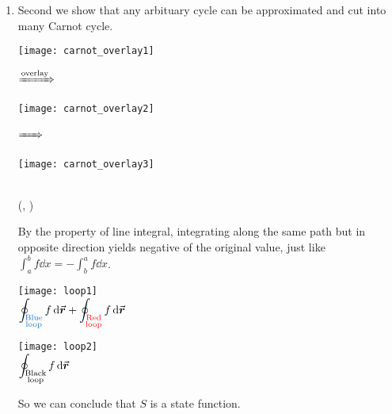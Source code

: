 \documentclass[class=article, crop=false, 12pt]{standalone}
\begin{document}
\begin{enumerate}
    \item Second we show that any arbituary cycle can be approximated and cut into many Carnot cycle.
    
    \begin{center}
        \begin{minipage}{0.28\linewidth}
            \centering
            \texttt{[image: carnot\_overlay1]}
        \end{minipage}
        $\xRightarrow{\text{overlay}}$
        \begin{minipage}{0.28\linewidth}
            \centering
            \texttt{[image: carnot\_overlay2]}
        \end{minipage}
        $\xRightarrow{\phantom{\text{over}}}$
        \begin{minipage}{0.28\linewidth}
            \centering
            \texttt{[image: carnot\_overlay3]}
        \end{minipage}\\[1em]
        (, )
    \end{center}

    By the property of line integral,
    integrating along the same path but in opposite direction yields negative of the original value,
    just like $\int_a^b f \dd{x} = -\int_b^a f \dd{x}$.

    \begin{center}
        \begin{minipage}{0.4\linewidth}
            \centering
            \texttt{[image: loop1]}\\
            $\displaystyle \oint_\blue{\substack{\text{Blue}\\\text{loop}}} f\dd{\vvec{r}} 
                + \oint_\red{\substack{\text{Red}\\\text{loop}}} f\dd{\vvec{r}}$
        \end{minipage}
        \qquad{\huge $=$}\qquad
        \begin{minipage}{0.38\linewidth}
            \centering
            \texttt{[image: loop2]}\\
            $\displaystyle \oint_{\substack{\text{Black}\\\text{loop}}} f\dd{\va*{r}}$
        \end{minipage}
    \end{center}

    So we can conclude that $S$ is a state function.

\end{enumerate}
\end{document}
